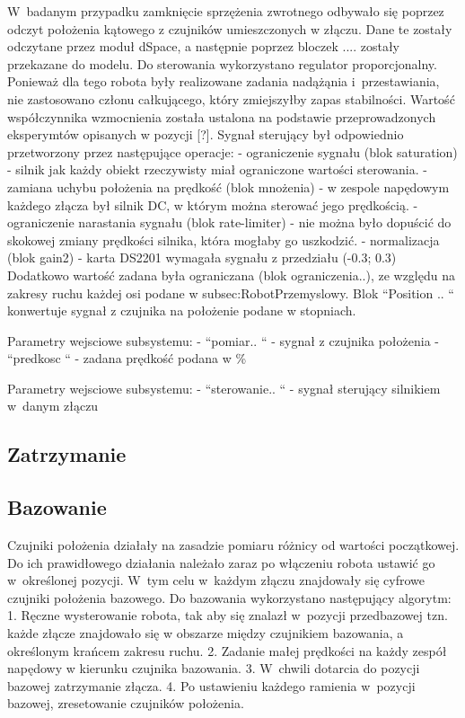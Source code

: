W~badanym przypadku zamknięcie sprzężenia zwrotnego odbywało się poprzez odczyt położenia kątowego z czujników umieszczonych w złączu. Dane te zostały odczytane przez moduł dSpace, a następnie poprzez bloczek .... zostały przekazane do modelu. Do sterowania wykorzystano regulator proporcjonalny. Ponieważ dla tego robota były realizowane zadania nadążąnia i~przestawiania, nie zastosowano członu całkującego, który zmiejszyłby zapas stabilności. Wartość współczynnika wzmocnienia została ustalona na podstawie przeprowadzonych eksperymtów opisanych w pozycji [?]. %
Sygnał sterujący był odpowiednio przetworzony przez następujące operacje:
- ograniczenie sygnału (blok saturation) - silnik jak każdy obiekt rzeczywisty miał ograniczone wartości sterowania.
- {} zamiana uchybu położenia na prędkość {} (blok mnożenia) - w zespole napędowym każdego złącza był silnik DC, w którym można sterować jego prędkością.
- ograniczenie narastania sygnału (blok rate-limiter) - nie można było dopuścić do skokowej zmiany prędkości silnika, która mogłaby go uszkodzić.
- normalizacja (blok gain2) -  karta DS2201 wymagała sygnału z przedziału (-0.3; 0.3)
Dodatkowo wartość zadana była ograniczana (blok ograniczenia..), ze względu na zakresy ruchu każdej osi podane w {subsec:RobotPrzemyslowy}.
Blok ``Position .. `` konwertuje sygnał z czujnika na położenie podane w stopniach.

Parametry wejsciowe subsystemu:
- ``pomiar.. `` - sygnał z czujnika położenia
- ``predkosc `` - zadana prędkość podana w \%

Parametry wejsciowe subsystemu:
- ``sterowanie.. `` - sygnał sterujący silnikiem w~danym złączu 

\subsection{Zatrzymanie}
\label{subsec:Zatrzymanie}



\label{subsec:sterowaniePredkoscia}

\subsection{Bazowanie}
\label{subsec:Bazowanie}

Czujniki położenia działały na zasadzie pomiaru różnicy od wartości początkowej. Do ich prawidłowego działania należało zaraz po włączeniu robota ustawić go w~określonej pozycji. W~tym celu w~każdym złączu znajdowały się cyfrowe czujniki położenia bazowego. Do bazowania wykorzystano następujący algorytm:
1. Ręczne wysterowanie robota, tak aby się znalazł w~pozycji przedbazowej tzn. każde złącze znajdowało się w obszarze między czujnikiem bazowania, a określonym krańcem zakresu ruchu.
2. Zadanie małej prędkości na każdy zespół napędowy w kierunku czujnika bazowania.
3. W~chwili dotarcia do pozycji bazowej zatrzymanie złącza.
4. Po ustawieniu każdego ramienia w~pozycji bazowej, zresetowanie czujników położenia.

